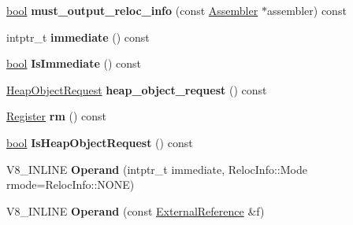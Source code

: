 \begin{DoxyCompactItemize}
\mbox{\label{classv8_1_1internal_1_1Operand_a844776d6bd0526be04231cd8442bc644}} 
\mbox{\hyperlink{classbool}{bool}} {\bfseries must\+\_\+output\+\_\+reloc\+\_\+info} (const \mbox{\hyperlink{classv8_1_1internal_1_1Assembler}{Assembler}} $\ast$assembler) const
\item 
\mbox{\label{classv8_1_1internal_1_1Operand_a1208356f90c3adeabb7fe4c60ae95fdf}} 
intptr\+\_\+t {\bfseries immediate} () const
\item 
\mbox{\label{classv8_1_1internal_1_1Operand_a8da286359e60a5ab8ba6e368fdca7d8b}} 
\mbox{\hyperlink{classbool}{bool}} {\bfseries Is\+Immediate} () const
\item 
\mbox{\label{classv8_1_1internal_1_1Operand_a9beaf04cfc4aea3a9d725172753766ed}} 
\mbox{\hyperlink{classv8_1_1internal_1_1HeapObjectRequest}{Heap\+Object\+Request}} {\bfseries heap\+\_\+object\+\_\+request} () const
\item 
\mbox{\label{classv8_1_1internal_1_1Operand_ad0495c31017fd74b04574225b3af4d39}} 
\mbox{\hyperlink{classv8_1_1internal_1_1Register}{Register}} {\bfseries rm} () const
\item 
\mbox{\label{classv8_1_1internal_1_1Operand_adc7ce8d04bde8ab9674a1bdc9689e5ee}} 
\mbox{\hyperlink{classbool}{bool}} {\bfseries Is\+Heap\+Object\+Request} () const
\item 
\mbox{\label{classv8_1_1internal_1_1Operand_a06953845aca3ef2752a5700b0dc82efb}} 
V8\+\_\+\+I\+N\+L\+I\+NE {\bfseries Operand} (intptr\+\_\+t immediate, Reloc\+Info\+::\+Mode rmode=Reloc\+Info\+::\+N\+O\+NE)
\item 
\mbox{\label{classv8_1_1internal_1_1Operand_a538d1dcaf002542b9144b5fbc062d728}} 
V8\+\_\+\+I\+N\+L\+I\+NE {\bfseries Operand} (const \mbox{\hyperlink{classv8_1_1internal_1_1ExternalReference}{External\+Reference}} \&f)
\item 
\mbox{\label{classv8_1_1internal_1_1Operand_a89275469683feb79dbec2790f984cf2d}} 

\end{DoxyCompactItemize}
